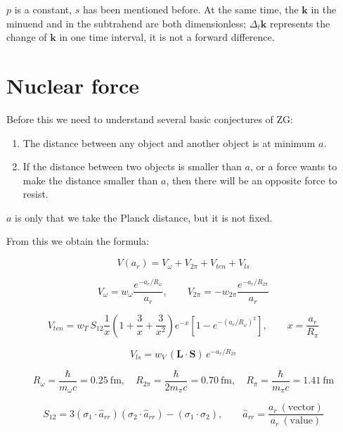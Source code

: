 \documentclass[UTF8]{article}
\begin{document}
\(p\) is a constant, \(s\) has been mentioned before. At the same time, the \(\mathbf{k}\) in the minuend and in the subtrahend are both dimensionless; \(\Delta_t\mathbf{k}\) represents the change of \(\mathbf{k}\) in one time interval, it is not a forward difference.

\section{Nuclear force}

Before this we need to understand several basic conjectures of ZG:

\begin{enumerate}
\item The distance between any object and another object is at minimum \(a\).
\item If the distance between two objects is smaller than \(a\), or a force wants to make the distance smaller than \(a\), then there will be an opposite force to resist.
\end{enumerate}

\(a\) is only that we take the Planck distance, but it is not fixed.

From this we obtain the formula:

\begin{equation}
V(a_r)=V_{\omega}+V_{2\pi}+V_{ten}+V_{ls}
\end{equation}

\begin{equation}
V_{\omega}=w_{\omega}\frac{e^{-a_r/R_{\omega}}}{a_r},\qquad
V_{2\pi}=-w_{2\pi}\frac{e^{-a_r/R_{2\pi}}}{a_r}
\end{equation}

\begin{equation}
V_{ten}=w_T\,S_{12}\frac{1}{x}\left(1+\frac{3}{x}+\frac{3}{x^2}\right)e^{-x}\left[1-e^{-(a_r/R_{\omega})^2}\right],\qquad x=\frac{a_r}{R_{\pi}}
\end{equation}

\begin{equation}
V_{ls}=w_V\,(\mathbf{L}\cdot\mathbf{S})\,e^{-a_r/R_{2\pi}}
\end{equation}

\begin{equation}
R_{\omega}=\frac{\hbar}{m_{\omega}c}=0.25\ \mathrm{fm},\quad
R_{2\pi}=\frac{\hbar}{2m_{\pi}c}=0.70\ \mathrm{fm},\quad
R_{\pi}=\frac{\hbar}{m_{\pi}c}=1.41\ \mathrm{fm}
\end{equation}

\begin{equation}
S_{12}=3(\sigma_1\cdot\hat a_{rr})(\sigma_2\cdot\hat a_{rr})-(\sigma_1\cdot\sigma_2),\qquad \hat a_{rr}=\frac{a_r\ (\text{vector})}{a_r\ (\text{value})}
\end{equation}
\end{document}
